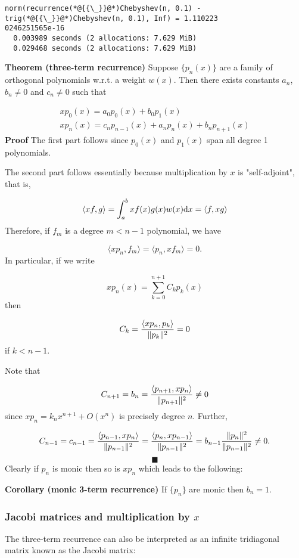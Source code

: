 \documentclass[12pt,a4paper]{article}
\begin{document}
\begin{lstlisting}
norm(recurrence(*@{{\_}}@*)Chebyshev(n, 0.1) - trig(*@{{\_}}@*)Chebyshev(n, 0.1), Inf) = 1.110223
0246251565e-16
  0.003989 seconds (2 allocations: 7.629 MiB)
  0.029468 seconds (2 allocations: 7.629 MiB)
\end{lstlisting}


\textbf{Theorem (three-term recurrence)} Suppose $\{p_n(x)\}$ are a family of orthogonal polynomials w.r.t. a weight $w(x)$. Then there exists constants $a_n$, $b_n \neq 0$ and $c_n \neq 0$ such that


\begin{align*}
x p_0(x) = a_0 p_0(x) + b_0 p_1(x) \\
x p_n(x) = c_n p_{n-1}(x) + a_n p_n(x) + b_n p_{n+1}(x)
\end{align*}
\textbf{Proof} The first part follows since $p_0(x)$ and $p_1(x)$ span all degree 1 polynomials.

The second part follows essentially because multiplication by $x$ is "self-adjoint", that is,

\[
\langle x f, g\rangle = \int_a^b x f(x) g(x) w(x) {\rm d}x = \langle f, x g \rangle
\]
Therefore, if $f_m$ is a degree $m < n-1$ polynomial, we have

\[
\langle x p_n, f_m\rangle = \langle p_n, x f_m\rangle = 0.
\]
In particular, if we write

\[
x p_n(x) = \sum_{k=0}^{n+1} C_k p_k(x)
\]
then

\[
C_k = {\langle x p_n, p_k\rangle \over \| p_k\|^2} = 0
\]
if $k < n-1$.

Note that

\[
C_{n+1} = b_n = {\ensuremath{\langle}p_{n+1}, x p_n\ensuremath{\rangle} \over \|p_{n+1} \|^2} \ensuremath{\ne} 0
\]
since $x p_n = k_n x^{n+1} + O(x^n)$ is precisely degree $n$. Further,

\[
C_{n-1} = c_{n-1} = {\ensuremath{\langle}p_{n-1}, x p_n\ensuremath{\rangle} \over \|p_{n-1}\|^2 } =
{\ensuremath{\langle}p_n, x p_{n-1}\ensuremath{\rangle}  \over \|p_{n-1}\|^2 } =  b_{n-1}{\|p_n\|^2  \over \|p_{n-1}\|^2 } \ensuremath{\ne} 0.
\]
\[
\blacksquare
\]
Clearly if $p_n$ is monic then so is $x p_n$ which leads to the following:

\textbf{Corollary (monic 3-term recurrence)} If $\{p_n\}$ are monic then $b_n =  1$.

\subsubsection{Jacobi matrices and multiplication by $x$}
The three-term recurrence can also be interpreted as an infinite tridiagonal matrix known as the Jacobi matrix:
\end{document}

